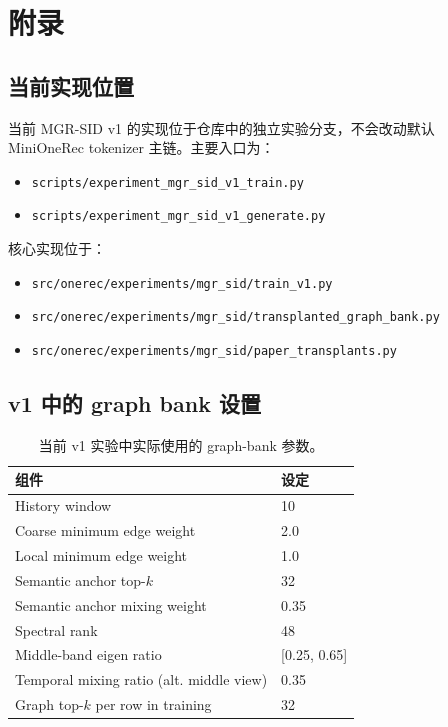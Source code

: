 \section{附录}

\subsection{当前实现位置}

当前 MGR-SID v1 的实现位于仓库中的独立实验分支，不会改动默认 MiniOneRec tokenizer 主链。主要入口为：
\begin{itemize}[leftmargin=1.4em]
  \item \texttt{scripts/experiment\_mgr\_sid\_v1\_train.py}
  \item \texttt{scripts/experiment\_mgr\_sid\_v1\_generate.py}
\end{itemize}

核心实现位于：
\begin{itemize}[leftmargin=1.4em]
  \item \texttt{src/onerec/experiments/mgr\_sid/train\_v1.py}
  \item \texttt{src/onerec/experiments/mgr\_sid/transplanted\_graph\_bank.py}
  \item \texttt{src/onerec/experiments/mgr\_sid/paper\_transplants.py}
\end{itemize}

\subsection{v1 中的 graph bank 设置}

\begin{table}[h]
  \centering
  \caption{当前 v1 实验中实际使用的 graph-bank 参数。}
  \label{tab:appendix-graph}
  \begin{tabular}{ll}
    \toprule
    组件 & 设定 \\
    \midrule
    History window & 10 \\
    Coarse minimum edge weight & 2.0 \\
    Local minimum edge weight & 1.0 \\
    Semantic anchor top-$k$ & 32 \\
    Semantic anchor mixing weight & 0.35 \\
    Spectral rank & 48 \\
    Middle-band eigen ratio & [0.25, 0.65] \\
    Temporal mixing ratio (alt. middle view) & 0.35 \\
    Graph top-$k$ per row in training & 32 \\
    \bottomrule
  \end{tabular}
\end{table}

